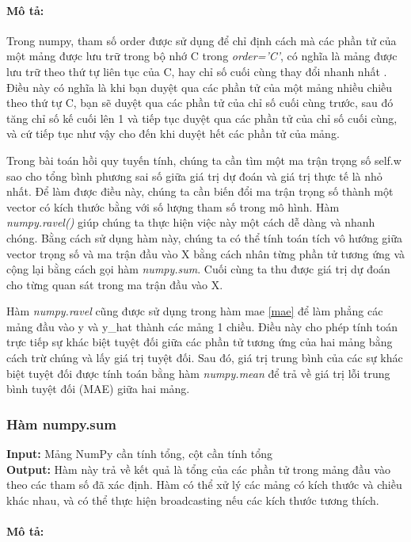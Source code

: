 \documentclass[]{article}
\begin{document}
\paragraph{Mô tả:}

Trong numpy, tham số order được sử dụng để chỉ định cách mà các phần tử của một mảng được lưu trữ trong bộ nhớ C trong \textit{order='C'}, có nghĩa là mảng được lưu trữ theo thứ tự liên tục của C, hay chỉ số cuối cùng thay đổi nhanh nhất \cite{stackoverflowCOrder}. Điều này có nghĩa là khi bạn duyệt qua các phần tử của một mảng nhiều chiều theo thứ tự C, bạn sẽ duyệt qua các phần tử của chỉ số cuối cùng trước, sau đó tăng chỉ số kế cuối lên 1 và tiếp tục duyệt qua các phần tử của chỉ số cuối cùng, và cứ tiếp tục như vậy cho đến khi duyệt hết các phần tử của mảng.

Trong bài toán hồi quy tuyến tính, chúng ta cần tìm một ma trận trọng số self.w sao cho tổng bình phương sai số giữa giá trị dự đoán và giá trị thực tế là nhỏ nhất. Để làm được điều này, chúng ta cần biến đổi ma trận trọng số thành một vector có kích thước bằng với số lượng tham số trong mô hình. Hàm \textit{numpy.ravel()} \cite{numpyNumpyravel} giúp chúng ta thực hiện việc này một cách dễ dàng và nhanh chóng. Bằng cách sử dụng hàm này, chúng ta có thể tính toán tích vô hướng giữa vector trọng số và ma trận đầu vào X bằng cách nhân từng phần tử tương ứng và cộng lại bằng cách gọi hàm \textit{numpy.sum}. Cuối cùng ta thu được giá trị dự đoán cho từng quan sát trong ma trận đầu vào X.

Hàm \textit{numpy.ravel} cũng được sử dụng trong hàm mae \ref{mae} để làm phẳng các mảng đầu vào y và y\_hat thành các mảng 1 chiều. Điều này cho phép tính toán trực tiếp sự khác biệt tuyệt đối giữa các phần tử tương ứng của hai mảng bằng cách trừ chúng và lấy giá trị tuyệt đối. Sau đó, giá trị trung bình của các sự khác biệt tuyệt đối được tính toán bằng hàm \textit{numpy.mean} để trả về giá trị lỗi trung bình tuyệt đối (MAE) giữa hai mảng.

\subsubsection{Hàm numpy.sum}
\noindent
\textbf{Input:} Mảng NumPy cần tính tổng, cột cần tính tổng \\
\textbf{Output:} Hàm này trả về kết quả là tổng của các phần tử trong mảng đầu vào theo các tham số đã xác định. Hàm có thể xử lý các mảng có kích thước và chiều khác nhau, và có thể thực hiện broadcasting nếu các kích thước tương thích.
\paragraph{Mô tả:}
\end{document}
